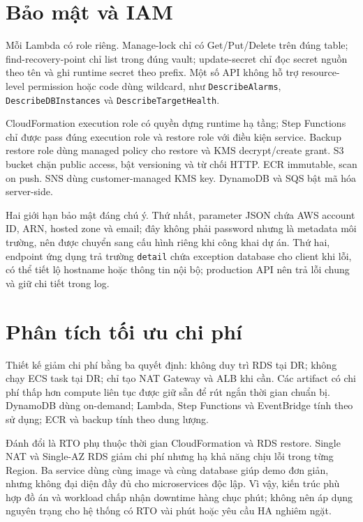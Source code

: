 \section{Bảo mật và IAM}

Mỗi Lambda có role riêng. Manage-lock chỉ có Get/Put/Delete trên đúng table; find-recovery-point chỉ list trong đúng vault; update-secret chỉ đọc secret nguồn theo tên và ghi runtime secret theo prefix. Một số API không hỗ trợ resource-level permission hoặc code dùng wildcard, như \texttt{DescribeAlarms}, \texttt{DescribeDBInstances} và \texttt{DescribeTargetHealth}.

CloudFormation execution role có quyền dựng runtime hạ tầng; Step Functions chỉ được pass đúng execution role và restore role với điều kiện service. Backup restore role dùng managed policy cho restore và KMS decrypt/create grant. S3 bucket chặn public access, bật versioning và từ chối HTTP. ECR immutable, scan on push. SNS dùng customer-managed KMS key. DynamoDB và SQS bật mã hóa server-side.

Hai giới hạn bảo mật đáng chú ý. Thứ nhất, parameter JSON chứa AWS account ID, ARN, hosted zone và email; đây không phải password nhưng là metadata môi trường, nên được chuyển sang cấu hình riêng khi công khai dự án. Thứ hai, endpoint ứng dụng trả trường \texttt{detail} chứa exception database cho client khi lỗi, có thể tiết lộ hostname hoặc thông tin nội bộ; production API nên trả lỗi chung và giữ chi tiết trong log.

\section{Phân tích tối ưu chi phí}

Thiết kế giảm chi phí bằng ba quyết định: không duy trì RDS tại DR; không chạy ECS task tại DR; chỉ tạo NAT Gateway và ALB khi cần. Các artifact có chi phí thấp hơn compute liên tục được giữ sẵn để rút ngắn thời gian chuẩn bị. DynamoDB dùng on-demand; Lambda, Step Functions và EventBridge tính theo sử dụng; ECR và backup tính theo dung lượng.

Đánh đổi là RTO phụ thuộc thời gian CloudFormation và RDS restore. Single NAT và Single-AZ RDS giảm chi phí nhưng hạ khả năng chịu lỗi trong từng Region. Ba service dùng cùng image và cùng database giúp demo đơn giản, nhưng không đại diện đầy đủ cho microservices độc lập. Vì vậy, kiến trúc phù hợp đồ án và workload chấp nhận downtime hàng chục phút; không nên áp dụng nguyên trạng cho hệ thống có RTO vài phút hoặc yêu cầu HA nghiêm ngặt.
